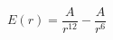\documentclass[12pt]{article}
\begin{document}
$$
   E(r) = \frac{A}{r^{12}} - \frac{A}{r^{6}}
$$
\end{document}
